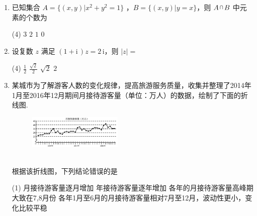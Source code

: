 \documentclass[11pt,space]{ctexart}
\begin{document}
\begin{enumerate}[itemsep=0.2em,topsep=0pt]
	\item 已知集合 $A=\{(x,y)|x^2+y^2=1\}$ ，$B=\{(x,y)|y=x\}$，则 $A{\,\raisebox{0.8mm}{\scaleobj{0.55}{\bigcap}}\,}B$ 中元素的个数为
	\begin{tasks}(4)
		\task $3$ \task $2$ \task $1$ \task $0$ 
	\end{tasks}
	\item 设复数 $z$ 满足 $(1+\mathrm{i}\,)z=2\,\mathrm{i}$，则 $|z|=$
	\begin{tasks}(4)
		\task $\frac{1}{2}$ \task $\frac{\sqrt{2}}{2}$ \task $\sqrt{2}$ \task $2$
	\end{tasks}
	\item 某城市为了解游客人数的变化规律，提高旅游服务质量，收集并整理了2014年1月至2016年12月期间月接待游客量（单位：万人）的数据，绘制了下面的折线图.\\[-2.5em]
	\begin{figure}[htbp]
		\centering
		\includegraphics[width=0.425\textwidth]{zxt.jpg}
	\end{figure}\\[-1.5em]
	根据该折线图，下列结论错误的是
	\begin{tasks}(1)
		\task 月接待游客量逐月增加 
		\task 年接待游客量逐年增加
		\task 各年的月接待游客量高峰期大致在7,8月份 
		\task 各年1月至6月的月接待游客量相对7月至12月，波动性更小，变化比较平稳 
	\end{tasks}
	

\end{enumerate}
\end{document}
